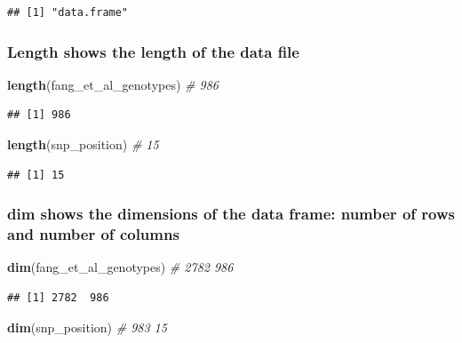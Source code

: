 \documentclass[
]{article}
\newenvironment{Shaded}{\begin{snugshade}}{\end{snugshade}}
\newcommand{\CommentTok}[1]{\textcolor[rgb]{0.56,0.35,0.01}{\textit{#1}}}
\newcommand{\FunctionTok}[1]{\textcolor[rgb]{0.13,0.29,0.53}{\textbf{#1}}}
\newcommand{\NormalTok}[1]{#1}
\begin{document}
\begin{verbatim}
## [1] "data.frame"
\end{verbatim}

\subsubsection{Length shows the length of the data
file}\label{length-shows-the-length-of-the-data-file}

\begin{Shaded}
\begin{Highlighting}[]
\FunctionTok{length}\NormalTok{(fang\_et\_al\_genotypes) }\CommentTok{\# 986}
\end{Highlighting}
\end{Shaded}

\begin{verbatim}
## [1] 986
\end{verbatim}

\begin{Shaded}
\begin{Highlighting}[]
\FunctionTok{length}\NormalTok{(snp\_position) }\CommentTok{\# 15}
\end{Highlighting}
\end{Shaded}

\begin{verbatim}
## [1] 15
\end{verbatim}

\subsubsection{dim shows the dimensions of the data frame: number of
rows and number of
columns}\label{dim-shows-the-dimensions-of-the-data-frame-number-of-rows-and-number-of-columns}

\begin{Shaded}
\begin{Highlighting}[]
\FunctionTok{dim}\NormalTok{(fang\_et\_al\_genotypes) }\CommentTok{\# 2782 986}
\end{Highlighting}
\end{Shaded}

\begin{verbatim}
## [1] 2782  986
\end{verbatim}

\begin{Shaded}
\begin{Highlighting}[]
\FunctionTok{dim}\NormalTok{(snp\_position) }\CommentTok{\# 983 15}
\end{Highlighting}
\end{Shaded}
\end{document}
